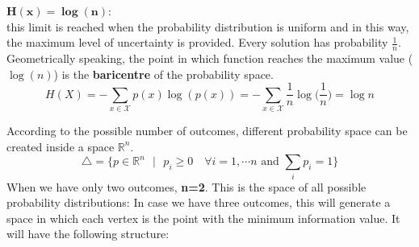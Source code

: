 $\mathbf{H(x) = \log(n)}$:\\
this limit is reached when the probability distribution is uniform and in this way, the maximum level of uncertainty is provided. Every solution has probability $\frac{1}{n}$. Geometrically speaking, the point in which function reaches the maximum value ($\log(n)$) is the \textbf{baricentre} of the probability space.\\
$$H(X) =  - \sum_{x \in \mathcal{X}}p(x)\log(p(x)) =  - \sum_{x \in \mathcal{X}}\frac{1}{n}\log\Big(\frac{1}{n}\Big) = \log n$$

According to the possible number of outcomes, different probability space can be created inside a space $\mathbb{R}^n$.
$$\bigtriangleup = \{p \in \mathbb{R}^n \text{  } |\text{  } p_i \geq 0 \quad	\forall i = 1, \cdots n \text{ and } \sum_i p_i = 1\}$$
When we have only two outcomes, \textbf{n=2}. This is the space of all possible probability distributions:
In case we have three outcomes, this will generate a space in which each vertex is the point with the minimum information value. It will have the following structure:



